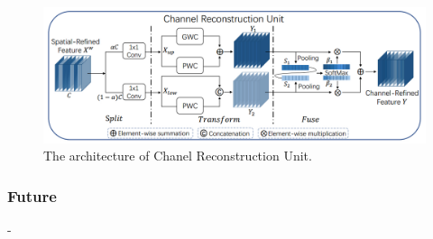 \documentclass[a4paper, 10pt]{article}
\begin{document}
		\begin{figure}[htbp]
			\centering 
			\includegraphics[width=\columnwidth]{picture/LLIE/SCConv/Chanel Reconstruction Unit}
			\caption{
				\label{fig: Chanel Reconstruction Unit} 
				The architecture of Chanel Reconstruction Unit.
			}
		\end{figure}
		
		\subsubsection{Future}
		
		-
		
		\renewcommand{\refname}{References}
		
		
			
			
			
			
			
			
		
		
		
		
		
	
\end{document}
